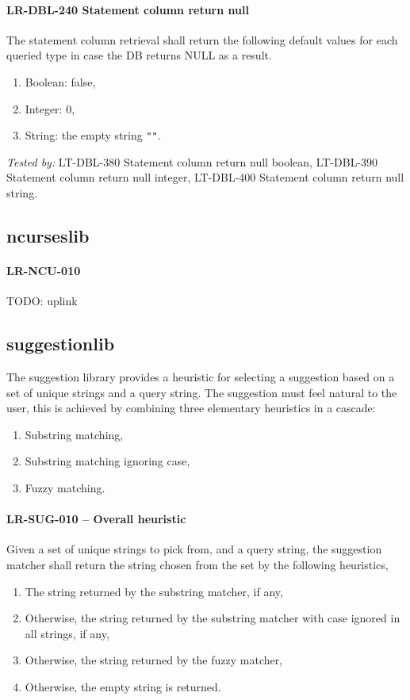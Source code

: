 \paragraph{LR-DBL-240 Statement column return null}
The statement column retrieval shall return the following
default values for each queried type in case the DB returns
NULL as a result.
\begin{enumerate}
\item Boolean: false,
\item Integer: 0,
\item String: the empty string \lstinline{""}.
\end{enumerate}

\textit{Tested by: } LT-DBL-380 Statement column return null boolean,
LT-DBL-390 Statement column return null integer,
LT-DBL-400 Statement column return null string.

\subsection{ncurses\textunderscore lib}
\paragraph{LR-NCU-010}
TODO: uplink

\subsection{suggestion\textunderscore lib}
The suggestion library provides a heuristic for selecting a suggestion
based on a set of unique strings and a query string. The suggestion
must feel natural to the user, this is achieved by combining three
elementary heuristics in a cascade:
\begin{enumerate}
\item Substring matching,
\item Substring matching ignoring case,
\item Fuzzy matching.
\end{enumerate}

\paragraph{LR-SUG-010 -- Overall heuristic}
Given a set of unique strings to pick from, and a query string,
the suggestion matcher shall return the string chosen from the set
by the following heuristics,
\begin{enumerate}
\item The string returned by the substring matcher, if any,
\item Otherwise, the string returned by the substring matcher
      with case ignored in all strings, if any,
\item Otherwise, the string returned by the fuzzy matcher,
\item Otherwise, the empty string is returned.
\end{enumerate}

